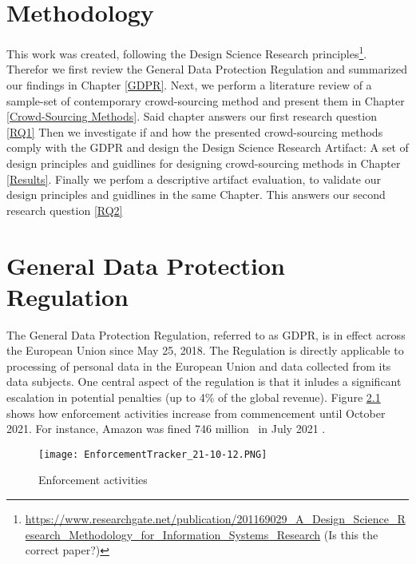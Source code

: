 \documentclass[a4paper,12pt]{report}
\begin{document}
	\chapter{Methodology}
	\startsection
		This work was created, following the Design Science Research principles\footnote{\url{https://www.researchgate.net/publication/201169029_A_Design_Science_Research_Methodology_for_Information_Systems_Research} (Is this the correct paper?)}.
		Therefor we first review the General Data Protection Regulation and summarized our findings in Chapter \ref{GDPR}.
		Next, we perform a literature review of a sample-set of contemporary crowd-sourcing method and present them in Chapter \ref{Crowd-Sourcing Methods}.
		Said chapter answers our first research question \ref{RQ1} %
		Then we investigate if and how the presented crowd-sourcing methods comply with the GDPR and design the Design Science Research Artifact: A set of design principles and guidlines for designing crowd-sourcing methods in Chapter \ref{Results}. %
		Finally we perfom a descriptive artifact evaluation, to validate our design principles and guidlines in the same Chapter.
		This answers our second research question \ref{RQ2} %
	\closesection


	\chapter{General Data Protection Regulation}  \label{GDPR}
	The General Data Protection Regulation, referred to as GDPR, is in effect across the European Union since May 25, 2018.
	The Regulation is directly applicable to processing of personal data in the European Union and data collected from its data subjects.
	One central aspect of the regulation is that it inludes a significant escalation in potential penalties (up to 4\% of the global revenue).
	Figure \ref{fig:enforcement_tracker} shows how enforcement activities increase from commencement until October 2021.
	For instance, Amazon was fined 746 million \texteuro \ in July 2021 \cite{EnforcementTracker}.
	\begin{figure}
		\centering
		\texttt{[image: EnforcementTracker\_21-10-12.PNG]}
		\caption{Enforcement activities \cite{EnforcementTracker}}
		\label{fig:enforcement_tracker}
	\end{figure}
	
\end{document}
